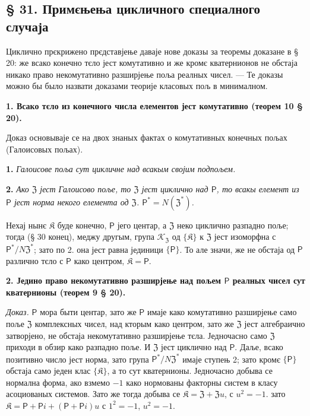 \documentclass[11pt]{article}
\begin{document}
\subsection*{§ 31. Примєњења цикличного специалного случаја}\label{anwendungen-des-zyklischen-spezialfalles}

Циклично прєкрижено прєдставјење даваје нове доказы за теоремы доказане в § 20: же всако конечно тєло јест комутативно и же кромє кватернионов не обстаја никако право некомутативно разширјење поља реалных чисел. --- Те доказы можно бы было назвати доказами теорије класовых пољ в минималном.

\noindent\textbf{1. Всако тєло из конечного числа елементов јест комутативно (теорем 10 § 20).}

Доказ основываје се на двох знаных фактах о комутативных конечных пољах (Галоисовых пољах).

\noindent\textbf{1.} \emph{Галоисове поља сут цикличне над всакым својим подпољем.}

\noindent\textbf{2.} \emph{Ако \(\mathfrak Z\) јест Галоисово поље, то \(\mathfrak Z\) јест циклично над \(\mathsf{P}\), то всакы елемент из \(\mathsf{P}\) јест норма некого елемента од \(\mathfrak Z\). \(\mathsf{P}^*=N(\mathfrak Z^*)\).}

Нехај нынє \(\mathfrak K\) буде конечно, \(\mathsf{P}\) јего центар, а \(\mathfrak Z\) неко циклично разпадно поље; тогда (§ 30 конец), меджу другым, група \(\mathscr K_{\mathfrak Z}\) од \(\{\mathfrak K\}\) к \(\mathfrak Z\) јест изоморфна с \(\mathsf{P}^*/N\mathfrak Z^*\); зато по 2. она јест равна јединици \(\{\mathsf{P}\}\). То але значи, же не обстаја од \(\mathsf{P}\) различно тєло с \(\mathsf{P}\) како центром, \(\mathfrak K=\mathsf{P}\).

\noindent\textbf{2. Једино право некомутативно разширјење над пољем \(\mathsf{P}\) реалных чисел сут кватернионы (теорем 9 § 20).}

\noindent\emph{Доказ.} \(\mathsf{P}\) мора быти центар, зато же \(\mathsf{P}\) имаје како комутативно разширјење само поље \(\mathfrak Z\) комплексных чисел, над кторым како центром, зато же \(\mathfrak Z\) јест алгебраично затворјено, не обстаја некомутативно разширјење тєла. Једночасно само \(\mathfrak Z\) приходи в обзир како разпадно поље. И \(\mathfrak Z\) јест циклично над \(\mathsf{P}\). Даље, всако позитивно число јест норма, зато група \(\mathsf{P}^*/N\mathfrak Z^*\) имаје ступењ 2; зато кромє \(\{\mathsf{P}\}\) обстаја само једен клас \(\{\mathfrak K\}\), а то сут кватернионы. Једночасно добыва се нормална форма, ако взмемо \(-1\) како нормованы факторны систем в класу асоциованых системов. Зато же тогда добыва се \(\mathfrak K=\mathfrak Z+\mathfrak Zu\), с \(u^2=-1\). зато \(\mathfrak K=\mathsf P+\mathsf Pi+(\mathsf P+\mathsf Pi)u\) с \(1^2=-1\), \(u^2=-1\).
\end{document}
